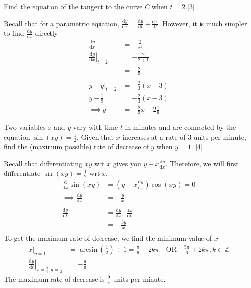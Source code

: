 \documentclass[12pt, a4 paper]{article}
\begin{document}
\begin{outline}[enumerate]
 \2 Find the equation of the tangent to the curve $C$ when $t=2$.\hfill[3]
 \begin{answer}
  Recall that for a parametric equation, $\frac{\mathrm{d}y}{\mathrm{d}x}=\frac{\mathrm{d}y}{\mathrm{d}t}\div\frac{\mathrm{d}x}{\mathrm{d}t}$. However, it is much simpler to find $\frac{\mathrm{d}y}{\mathrm{d}x}$ directly
  \begin{align*}
   \frac{\mathrm{d}y}{\mathrm{d}x}                    & = -\frac{2}{x^3}             \\
   \left.\frac{\mathrm{d}y}{\mathrm{d}x}\right|_{t=2} & = -\frac{2}{2+1}             \\
                                                      & = -\frac{2}{3}               \\\\
   y-y|_{t=2}                                         & = -\frac{2}{3}(x-3)          \\
   y - \frac{1}{9}                                    & = -\frac{2}{3}(x-3)          \\
   \implies y                                         & = -\frac{2}{3}x+2\frac{1}{9}
  \end{align*}
 \end{answer}

 \1 Two variables $x$ and $y$ vary with time $t$ in minutes and are connected by the equation $\sin (xy) = \frac{1}{2}$. Given that $x$ increases at a rate of 3 units per minute, find the (maximum possible) rate of decrease of $y$ when $y = 1$. \hfill[4] %
 \begin{answer}
  Recall that differentiating $xy$ wrt $x$ gives you $y+x\frac{\mathrm{d}y}{\mathrm{d}x}$. Therefore, we will first differentiate $\sin (xy) = \frac{1}{2}$ wrt $x$.
  \begin{align*}
   \frac{\mathrm{d}}{\mathrm{d}x}\sin (xy)  & = \left(y+x\frac{\mathrm{d}y}{\mathrm{d}x}\right)\cos(xy) = 0           \\
   \implies \frac{\mathrm{d}y}{\mathrm{d}x} & = -\frac{y}{x}                                                          \\\\
   \frac{\mathrm{d}y}{\mathrm{d}t}          & = \frac{\mathrm{d}y}{\mathrm{d}x} \cdot \frac{\mathrm{d}x}{\mathrm{d}t} \\
                                            & = -\frac{3y}{x}                                                         \\
  \end{align*}
  To get the maximum rate of decrease, we find the minimum value of $x$
  \begin{align*}
   x|_{y=1}                                                                      & = \arcsin\left(\frac{1}{2}\right)\div 1 = \frac{\pi}{6} + 2k\pi \quad\textrm{OR}\quad \frac{5\pi}{6} + 2k\pi, k\in\mathbb{Z} \\
   \left.\frac{\mathrm{d}y}{\mathrm{d}t}\right|_{x=\frac{\pi}{6}, y=\frac{1}{2}} & = -\frac{9}{\pi}
  \end{align*}
  The maximum rate of decrease is $\frac{9}{\pi}$ units per minute.
 \end{answer}


\end{outline}
\end{document}
